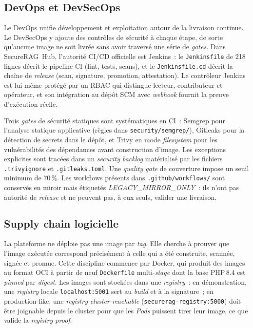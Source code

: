 \subsection{DevOps et DevSecOps}
\label{subsec:concepts-devsecops}

Le DevOps unifie développement et exploitation autour de la livraison
continue. Le DevSecOps y ajoute des contrôles de sécurité à chaque étape,
de sorte qu'aucune image ne soit livrée sans avoir traversé une série de
\emph{gates}. Dans SecureRAG~Hub, l'autorité CI/CD officielle est
Jenkins~: le \texttt{Jenkinsfile} de 218 lignes décrit le pipeline CI
(lint, tests, scans), et le \texttt{Jenkinsfile.cd} décrit la chaîne de
\emph{release} (scan, signature, promotion, attestation). Le contrôleur
Jenkins est lui-même protégé par un RBAC qui distingue lecteur,
contributeur et opérateur, et son intégration au dépôt SCM avec
\emph{webhook} fournit la preuve d'exécution réelle.

Trois \emph{gates} de sécurité statiques sont systématiques en CI~:
Semgrep pour l'analyse statique applicative (règles dans
\texttt{security/semgrep/}), Gitleaks pour la détection de secrets dans
le dépôt, et Trivy en mode \emph{filesystem} pour les vulnérabilités des
dépendances avant construction d'image. Les exceptions explicites sont
tracées dans un \emph{security backlog} matérialisé par les fichiers
\texttt{.trivyignore} et \texttt{.gitleaks.toml}. Une \emph{quality gate}
de couverture impose un seuil minimum de 70\,\%. Les workflows présents
dans \texttt{.github/workflows/} sont conservés en miroir mais étiquetés
\emph{LEGACY\_MIRROR\_ONLY}~: ils n'ont pas autorité de \emph{release} et
ne peuvent pas, à eux seuls, valider une livraison.

\subsection{Supply chain logicielle}
\label{subsec:concepts-supply-chain}

La plateforme ne déploie pas une image par \emph{tag}. Elle cherche à
prouver que l'image exécutée correspond précisément à celle qui a été
construite, scannée, signée et promue. Cette discipline commence par
Docker, qui produit des images au format OCI à partir de neuf
\texttt{Dockerfile} multi-\emph{stage} dont la base PHP\,8.4 est
\emph{pinned} par \emph{digest}. Les images sont stockées dans une
\emph{registry}~: en démonstration, une \emph{registry} locale
\texttt{localhost:5001} sert au \emph{build} et à la signature~; en
production-like, une \emph{registry} \emph{cluster-reachable}
(\texttt{securerag-registry:5000}) doit être joignable depuis le cluster
pour que les \emph{Pods} puissent tirer leur image, ce que valide la
\emph{registry proof}.

